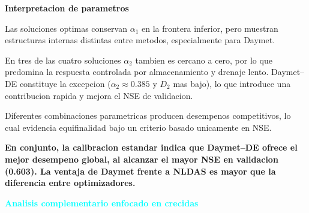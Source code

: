 \documentclass[12pt]{article}
\begin{document}
\begin{table}[H]
        \centering
        \scriptsize
        \caption{Resultados calibración estándar (NSE)}
        \label{tab:cal_std}
        \end{table}

\textbf{Interpretacion de parametros}

Las soluciones optimas conservan $\alpha_1$ en la frontera inferior, pero muestran estructuras internas distintas entre metodos, especialmente para Daymet.

En tres de las cuatro soluciones $\alpha_2$ tambien es cercano a cero, por lo que predomina la respuesta controlada por almacenamiento y drenaje lento. Daymet--DE constituye la excepcion ($\alpha_2 \approx 0.385$ y $D_2$ mas bajo), lo que introduce una contribucion rapida y mejora el NSE de validacion.

Diferentes combinaciones parametricas producen desempenos competitivos, lo cual evidencia equifinalidad bajo un criterio basado unicamente en NSE.

\textbf{\large En conjunto, la calibracion estandar indica que Daymet--DE ofrece el mejor desempeno global, al alcanzar el mayor NSE en validacion (0.603). La ventaja de Daymet frente a NLDAS es mayor que la diferencia entre optimizadores.}


\vspace{0.5em}
{\Large\textbf{\textcolor{cyan}{Analisis complementario enfocado en crecidas}}}
\end{document}
